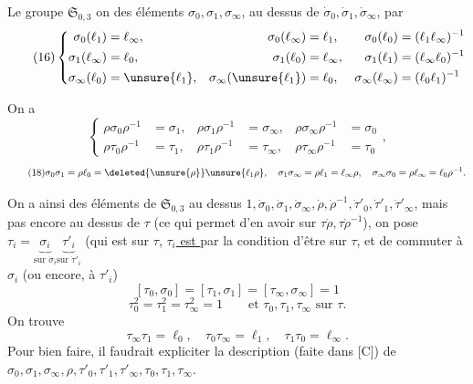  Le groupe $\mathfrak S_{0,3}$ on  des éléments
$\sigma_0,\sigma_1,\sigma_\infty$, au dessus de $\dot\sigma_0,\dot\sigma_1,\dot\sigma_\infty$, par
\[
\tag{16}
\left\{\begin{aligned}
\sigma_0(\ell_1)&=\ell_\infty,& \sigma_0(\ell_\infty)&=\ell_1,& \sigma_0(\ell_0)&=(\ell_1\ell_\infty)^{-1}\\
\sigma_1(\ell_\infty)&=\ell_0,& \sigma_1(\ell_0)&=\ell_\infty,& \sigma_1(\ell_1)&=(\ell_\infty\ell_0)^{-1}\\
\sigma_\infty(\ell_0)&=\unsure{\ell_1},& \sigma_\infty(\unsure{\ell_1})&=\ell_0,& \sigma_\infty(\ell_\infty)&=(\ell_0\ell_1)^{-1}
\end{aligned}\right.
\]

On a
\[
\tag{17}
\left\{\begin{aligned}
\rho\sigma_0\rho^{-1}&=\sigma_1,& \rho\sigma_1\rho^{-1}&=\sigma_\infty,& \rho\sigma_\infty\rho^{-1}&=\sigma_0\\
\rho\tau_0\rho^{-1}&=\tau_1,& \rho\tau_1\rho^{-1}&=\tau_\infty,& \rho\tau_\infty\rho^{-1}&=\tau_0
\end{aligned}\right.,
\]
\[
\tag{18}
\sigma_0\sigma_1=\rho\ell_0=\deleted{\unsure{\rho}}\unsure{\ell_1\rho},\quad
\sigma_1\sigma_\infty=\rho\ell_1=\ell_\infty\rho,\quad
\sigma_\infty\sigma_0=\rho\ell_\infty=\ell_0\rho^{-1}.
\]


On a ainsi des éléments de $\mathfrak S_{0,3}$ au dessus 
$1,\dot\sigma_0,\dot\sigma_1,\dot\sigma_\infty,\dot\rho,\dot\rho^{-1},\dot\tau'_0,\dot\tau'_1,\dot\tau'_\infty$,
mais pas encore au dessus de $\tau$ (ce qui permet d'en avoir sur $\tau\dot\rho,\tau\dot\rho^{-1}$),
on pose
$\tau_i=\underbrace{\sigma_i}_{\text{sur }\dot\sigma_i}\underbrace{\tau'_i}_{\text{sur }\dot\tau'_i}$
(qui est sur $\tau$, 
\uline{$\tau_i$ est } 
par la condition d'être sur $\tau$,  et de commuter à $\sigma_i$ (ou encore, à $\tau'_i$)
\[
\tag{19}
[\tau_0,\sigma_0]=[\tau_1,\sigma_1]=[\tau_\infty,\sigma_\infty]=1
\]
\[
\tag{20}
\tau_0^2=\tau_1^2=\tau_\infty^2=1
\qquad\text{et }\tau_0,\tau_1,\tau_\infty\text{ sur }\tau.
\]
On trouve
\[
\tag{21}
\tau_\infty\tau_1=\ell_0,\quad\tau_0\tau_\infty=\ell_1,\quad\tau_1\tau_0=\ell_\infty.
\]
Pour bien faire, il faudrait expliciter la description  (faite dans [C]) de
$\sigma_0,\sigma_1,\sigma_\infty,\rho,\tau'_0,\tau'_1,\tau'_\infty,\tau_0,\tau_1,\tau_\infty$.

